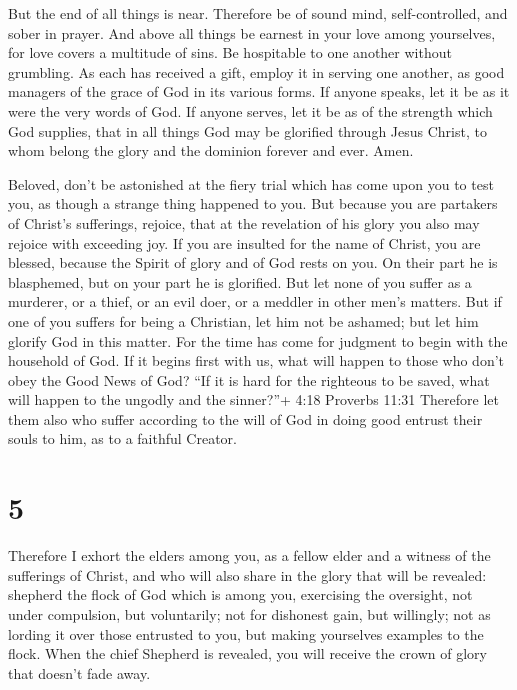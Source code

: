  But the end of all things is near. Therefore be of sound
mind, self-controlled, and sober in prayer.  And above all
things be earnest in your love among yourselves, for love covers a
multitude of sins.  Be hospitable to one another without
grumbling.  As each has received a gift, employ it in
serving one another, as good managers of the grace of God in its various
forms.  If anyone speaks, let it be as it were the very
words of God. If anyone serves, let it be as of the strength which God
supplies, that in all things God may be glorified through Jesus Christ,
to whom belong the glory and the dominion forever and ever. Amen.

 Beloved, don't be astonished at the fiery trial which has
come upon you to test you, as though a strange thing happened to you.
 But because you are partakers of Christ's sufferings,
rejoice, that at the revelation of his glory you also may rejoice with
exceeding joy.  If you are insulted for the name of Christ,
you are blessed, because the Spirit of glory and of God rests on you. On
their part he is blasphemed, but on your part he is glorified.
 But let none of you suffer as a murderer, or a thief, or
an evil doer, or a meddler in other men's matters.  But if
one of you suffers for being a Christian, let him not be ashamed; but
let him glorify God in this matter.  For the time has come
for judgment to begin with the household of God. If it begins first with
us, what will happen to those who don't obey the Good News of God?
 ``If it is hard for the righteous to be saved, what will
happen to the ungodly and the sinner?''+ 4:18 Proverbs 11:31
 Therefore let them also who suffer according to the will
of God in doing good entrust their souls to him, as to a faithful
Creator.

\hypertarget{section-4}{%
\section{5}\label{section-4}}

 Therefore I exhort the elders among you, as a fellow elder
and a witness of the sufferings of Christ, and who will also share in
the glory that will be revealed:  shepherd the flock of God
which is among you, exercising the oversight, not under compulsion, but
voluntarily; not for dishonest gain, but willingly;  not as
lording it over those entrusted to you, but making yourselves examples
to the flock.  When the chief Shepherd is revealed, you will
receive the crown of glory that doesn't fade away.

